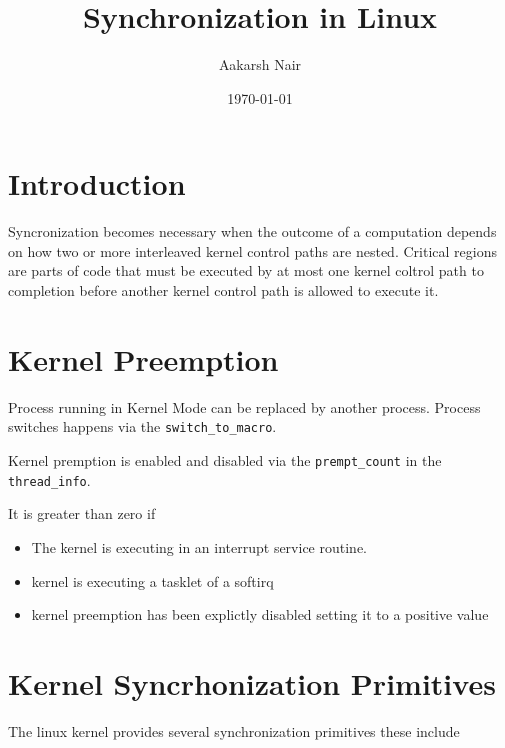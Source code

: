 \documentclass{article}
\title{Synchronization in Linux}
\author{Aakarsh Nair}
\date{\today}
\begin{document}
\lstset{language=C}  
\maketitle

\setcounter{tocdepth}{3}
\tableofcontents

\maketitle
\vspace*{1cm}

\section{Introduction}

Syncronization becomes necessary when the outcome of a computation
depends on how two or more interleaved kernel control paths are
nested. Critical regions are parts of code that must be executed by at
most one kernel coltrol path to completion before another kernel
control path is allowed to execute it.

\section{Kernel Preemption}

Process running in Kernel Mode can be replaced by another
process. Process switches happens via the \lstinline{switch_to_macro}.

Kernel premption is enabled and disabled via the
\lstinline{prempt_count} in the \lstinline{thread_info}.

It is greater than zero if 

\begin{itemize}
\item The kernel is executing in an interrupt service routine.
\item kernel is executing a tasklet of a softirq
\item kernel preemption has been explictly disabled setting it to a
  positive value
\end{itemize}

\section{Kernel Syncrhonization Primitives}

The linux kernel provides several synchronization primitives these
include
\end{document}
